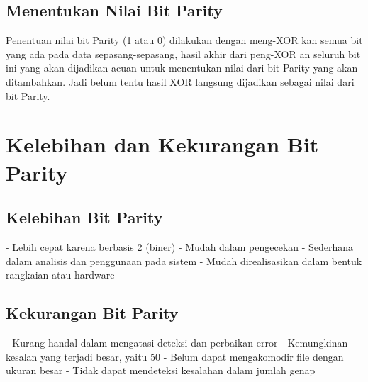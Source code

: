 \subsection{Menentukan Nilai Bit Parity}
Penentuan nilai bit Parity (1 atau 0) dilakukan dengan meng-XOR kan semua bit yang ada pada data sepasang-sepasang, hasil akhir dari peng-XOR an seluruh bit ini yang akan dijadikan acuan untuk menentukan nilai dari bit Parity yang akan ditambahkan. Jadi belum tentu hasil XOR langsung dijadikan sebagai nilai dari bit Parity.



\section{Kelebihan dan Kekurangan Bit Parity}
\subsection{Kelebihan Bit Parity}
-   Lebih cepat karena berbasis 2 (biner)
-   Mudah dalam pengecekan
-   Sederhana dalam analisis dan penggunaan pada sistem
-   Mudah direalisasikan dalam bentuk rangkaian atau hardware

\subsection{Kekurangan Bit Parity}
-   Kurang handal dalam mengatasi deteksi dan perbaikan error
-   Kemungkinan kesalan yang terjadi besar, yaitu 50%
-   Belum dapat mengakomodir file dengan ukuran besar
-   Tidak dapat mendeteksi kesalahan dalam jumlah genap



